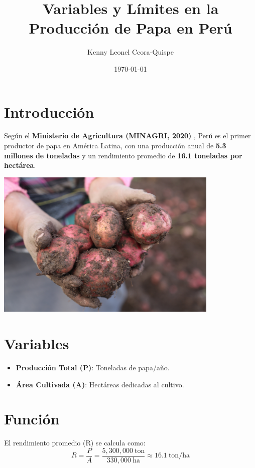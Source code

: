 \documentclass{article}
\begin{document}
\title{Variables y Límites en la Producción de Papa en Perú}
\author{Kenny Leonel Ccora-Quispe}
\date{\today}
\maketitle

\section{Introducción}
Según el \textbf{Ministerio de Agricultura (MINAGRI, 2020)} \cite{minagri2020}, Perú es el primer productor de papa en América Latina, con una producción anual de \textbf{5.3 millones de toneladas} y un rendimiento promedio de \textbf{16.1 toneladas por hectárea}.

\begin{center}
\includegraphics[width=0.8\textwidth]{la_papa.jpg} %
\end{center}

\section{Variables}
\begin{itemize}
    \item \textbf{Producción Total (P)}: Toneladas de papa/año.
    \item \textbf{Área Cultivada (A)}: Hectáreas dedicadas al cultivo.
\end{itemize}

\section{Función}
El rendimiento promedio (R) se calcula como:
\[
R = \frac{P}{A} = \frac{5,300,000\ \text{ton}}{330,000\ \text{ha}} \approx 16.1\ \text{ton/ha}
\]
\end{document}
